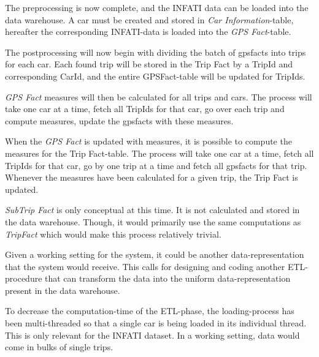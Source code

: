 The preprocessing is now complete, and the INFATI data can be loaded into the data warehouse. A car must be created and stored in \textit{Car Information}-table, hereafter the corresponding INFATI-data is loaded into the \textit{GPS Fact}-table. 

The postprocessing will now begin with dividing the batch of gpsfacts into trips for each car. Each found trip will be stored in the Trip Fact by a TripId and corresponding CarId, and the entire GPSFact-table will be updated for TripIds. 

\textit{GPS Fact} measures will then be calculated for all trips and cars. The process will take one car at a time, fetch all TripIds for that car, go over each trip and compute measures, update the gpsfacts with these measures.

When the \textit{GPS Fact} is updated with measures, it is possible to compute the measures for the Trip Fact-table. The process will take one car at a time, fetch all TripIds for that car, go by one trip at a time and fetch all gpsfacts for that trip. Whenever the measures have been calculated for a given trip, the Trip Fact is updated.

\textit{SubTrip Fact} is only conceptual at this time. It is not calculated and stored in the data warehouse. Though, it would primarily use the same computations as \textit{TripFact} which would make this process relatively trivial.

Given a working setting for the system, it could be another data-representation that the system would receive. This calls for designing and coding another ETL-procedure that can transform the data into the uniform data-representation present in the data warehouse.

To decrease the computation-time of the ETL-phase, the loading-process has been multi-threaded so that a single car is being loaded in its individual thread. This is only relevant for the INFATI dataset. In a working setting, data would come in bulks of single trips. 